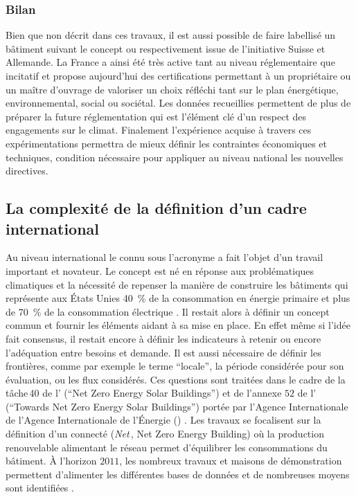 \subsubsection{Bilan} %
\label{ssub:bilan}
Bien que non décrit dans ces travaux, il est aussi possible de faire labellisé un bâtiment
suivant le concept  ou
 respectivement issue de
l’initiative Suisse et Allemande. La France a ainsi été très active tant au niveau
réglementaire que incitatif et propose aujourd’hui des certifications permettant à un
propriétaire ou un maître d’ouvrage de valoriser un choix réfléchi tant sur le plan
énergétique, environnemental, social ou sociétal. Les données recueillies permettent de
plus de préparer la future réglementation qui est l’élément clé d’un respect des
engagements sur le climat. Finalement l’expérience acquise à travers ces expérimentations
permettra de mieux définir les contraintes économiques et techniques, condition nécessaire
pour appliquer au niveau national les nouvelles directives.



\subsection{La complexité de la définition d’un cadre international} %
\label{sub:la_definition_d_un_cadre_international}
Au niveau international le  connu sous l’acronyme  a fait l’objet d’un
travail important et novateur.
Le concept est né en réponse aux problématiques climatiques et la nécessité
de repenser la manière de construire les bâtiments qui représente aux États Unies
\SI{40}{\percent} de la consommation en énergie primaire et plus de \SI{70}{\percent}
de la consommation électrique \parencite{Torcellini2006a}. Il
restait alors à définir un concept commun et fournir les éléments aidant à sa mise en
place. En effet même si l’idée fait consensus, il restait encore à définir les indicateurs
à retenir ou encore l’adéquation entre besoins et demande.
Il est aussi nécessaire de définir les frontières, comme par exemple le terme \enquote{locale},
la période considérée pour son évaluation, ou les flux considérés. Ces questions sont traitées
dans le cadre de la tâche\,40 de l’ (\enquote{Net Zero Energy Solar Buildings}) et de l’annexe $52$ de
l’ (\enquote{Towards Net Zero Energy Solar Buildings}) portée par l’Agence Internationale
de l’Agence Internationale de l’Énergie () \parencite{Athienitis2015}. Les travaux se focalisent
sur la définition d’un  connecté (\textit{Net}\,, Net Zero Energy Building) où
la production renouvelable alimentant le réseau permet d’équilibrer les consommations du bâtiment.
À l’horizon $2011$, les nombreux travaux et maisons de démonstration permettent d’alimenter
les différentes bases de données et de nombreuses moyens sont identifiées
\parencite{Marszal2011971}.


